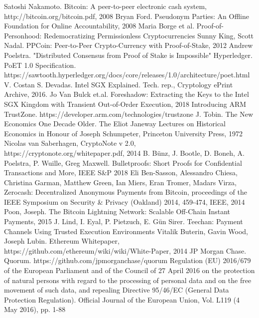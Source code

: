 \documentclass[conference]{IEEEtran}
\begin{document}
\begin{thebibliography}{00}
 Satoshi Nakamoto. Bitcoin: A peer-to-peer electronic cash system, http://bitcoin.org/bitcoin.pdf, 2008
 Bryan Ford. Pseudonym Parties:
An Offline Foundation for Online Accountability, 2008
 Maria Borge et al. Proof-of-Personhood: Redemocratizing Permissionless Cryptocurrencies
 Sunny King, Scott Nadal. PPCoin: Peer-to-Peer Crypto-Currency with Proof-of-Stake, 2012
 Andrew Poelstra. "Distributed Consensus from Proof of Stake is Impossible"
 Hyperledger. PoET 1.0 Specification.  https://sawtooth.hyperledger.org/docs/core/releases/1.0/architecture/poet.html
 V. Costan S. Devadas. Intel SGX Explained. Tech. rep., Cryptology ePrint
Archive, 2016.
 Jo Van Bulck et.al. Foreshadow: Extracting the Keys to the Intel SGX Kingdom with Transient Out-of-Order Execution, 2018
 Introducing ARM TrustZone. https://developer.arm.com/technologies/trustzone
 J. Tobin. The New Economics One Decade Older. The Eliot Janeway Lectures on
Historical Economics in Honour of Joseph Schumpeter,
Princeton University Press, 1972
 Nicolas van Saberhagen, CryptoNote v 2.0, https://cryptonote.org/whitepaper.pdf, 2014
B. Bünz, J. Bootle, D. Boneh, A. Poelstra, P. Wuille, Greg Maxwell. Bulletproofs: Short Proofs for Confidential Transactions and More,  IEEE S\&P 2018
Eli Ben-Sasson, Alessandro Chiesa, Christina Garman, Matthew Green, Ian Miers, Eran Tromer, Madars Virza, Zerocash: Decentralized Anonymous Payments from Bitcoin, proceedings of the IEEE Symposium on Security \& Privacy (Oakland) 2014, 459-474, IEEE, 2014
Poon, Joseph. The Bitcoin Lightning Network: Scalable Off-Chain Instant Payments, 2015
 J. Lind, I. Eyal, P. Pietzuch, E. Gün Sirer. Teechan: Payment Channels Using Trusted Execution Environments
 Vitalik Buterin, Gavin Wood, Joseph Lubin. Ethereum Whitepaper, https://github.com/ethereum/wiki/wiki/White-Paper, 2014
JP Morgan Chase. Quorum. https://github.com/jpmorganchase/quorum
Regulation (EU) 2016/679 of the European Parliament and of the Council of 27 April 2016 on the protection of natural persons with regard to the processing of personal data and on the free movement of such data, and repealing Directive 95/46/EC (General Data Protection Regulation). Official Journal of the European Union, Vol. L119 (4 May 2016), pp. 1-88

\end{thebibliography}
\end{document}
